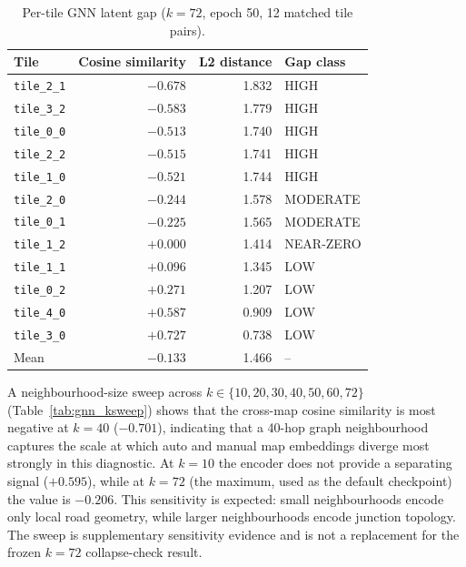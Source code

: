 \begin{table}[htbp]
\centering
\small
\begin{tabular}{lrrl}
\toprule
Tile & Cosine similarity & L2 distance & Gap class \\
\midrule
\texttt{tile\_2\_1} & $-0.678$ & 1.832 & HIGH \\
\texttt{tile\_3\_2} & $-0.583$ & 1.779 & HIGH \\
\texttt{tile\_0\_0} & $-0.513$ & 1.740 & HIGH \\
\texttt{tile\_2\_2} & $-0.515$ & 1.741 & HIGH \\
\texttt{tile\_1\_0} & $-0.521$ & 1.744 & HIGH \\
\texttt{tile\_2\_0} & $-0.244$ & 1.578 & MODERATE \\
\texttt{tile\_0\_1} & $-0.225$ & 1.565 & MODERATE \\
\texttt{tile\_1\_2} & $+0.000$ & 1.414 & NEAR-ZERO \\
\texttt{tile\_1\_1} & $+0.096$ & 1.345 & LOW \\
\texttt{tile\_0\_2} & $+0.271$ & 1.207 & LOW \\
\texttt{tile\_4\_0} & $+0.587$ & 0.909 & LOW \\
\texttt{tile\_3\_0} & $+0.727$ & 0.738 & LOW \\
\midrule
Mean & $-0.133$ & 1.466 & -- \\
\bottomrule
\end{tabular}
\caption{Per-tile GNN latent gap ($k=72$, epoch 50, 12 matched tile pairs).}
\label{tab:gnn_per_tile}
\end{table}

A neighbourhood-size sweep across $k \in \{10, 20, 30, 40, 50, 60, 72\}$ (Table~\ref{tab:gnn_ksweep}) shows that the cross-map cosine similarity is most negative at $k=40$ ($-0.701$), indicating that a 40-hop graph neighbourhood captures the scale at which auto and manual map embeddings diverge most strongly in this diagnostic. At $k=10$ the encoder does not provide a separating signal ($+0.595$), while at $k=72$ (the maximum, used as the default checkpoint) the value is $-0.206$. This sensitivity is expected: small neighbourhoods encode only local road geometry, while larger neighbourhoods encode junction topology. The sweep is supplementary sensitivity evidence and is not a replacement for the frozen $k=72$ collapse-check result.

